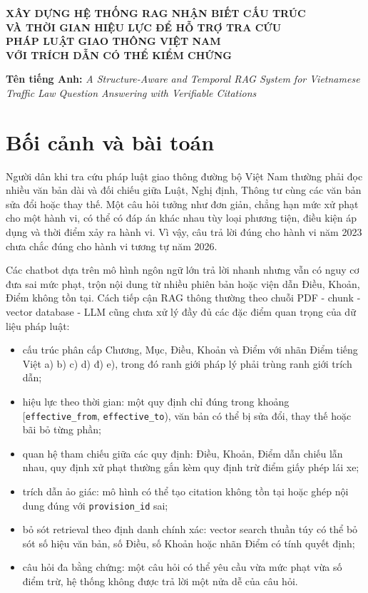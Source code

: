 \documentclass[12pt,a4paper]{article}
\begin{document}
\begin{center}
  {\bfseries\Large
  XÂY DỰNG HỆ THỐNG RAG NHẬN BIẾT CẤU TRÚC\\
  VÀ THỜI GIAN HIỆU LỰC ĐỂ HỖ TRỢ TRA CỨU\\
  PHÁP LUẬT GIAO THÔNG VIỆT NAM\\
  VỚI TRÍCH DẪN CÓ THỂ KIỂM CHỨNG}
\end{center}

\vspace{0.6em}

\noindent
\textbf{Tên tiếng Anh:}
\emph{A Structure-Aware and Temporal RAG System for Vietnamese Traffic Law Question Answering with Verifiable Citations}

\section{Bối cảnh và bài toán}

Người dân khi tra cứu pháp luật giao thông đường bộ Việt Nam thường phải đọc nhiều văn bản dài và đối chiếu giữa Luật, Nghị định, Thông tư cùng các văn bản sửa đổi hoặc thay thế. Một câu hỏi tưởng như đơn giản, chẳng hạn mức xử phạt cho một hành vi, có thể có đáp án khác nhau tùy loại phương tiện, điều kiện áp dụng và thời điểm xảy ra hành vi. Vì vậy, câu trả lời đúng cho hành vi năm 2023 chưa chắc đúng cho hành vi tương tự năm 2026.

Các chatbot dựa trên mô hình ngôn ngữ lớn trả lời nhanh nhưng vẫn có nguy cơ đưa sai mức phạt, trộn nội dung từ nhiều phiên bản hoặc viện dẫn Điều, Khoản, Điểm không tồn tại. Cách tiếp cận RAG thông thường theo chuỗi PDF - chunk - vector database - LLM cũng chưa xử lý đầy đủ các đặc điểm quan trọng của dữ liệu pháp luật:

\begin{itemize}
  \item cấu trúc phân cấp Chương, Mục, Điều, Khoản và Điểm với nhãn Điểm tiếng Việt a) b) c) d) đ) e), trong đó ranh giới pháp lý phải trùng ranh giới trích dẫn;
  \item hiệu lực theo thời gian: một quy định chỉ đúng trong khoảng [\texttt{effective\_from}, \texttt{effective\_to}), văn bản có thể bị sửa đổi, thay thế hoặc bãi bỏ từng phần;
  \item quan hệ tham chiếu giữa các quy định: Điều, Khoản, Điểm dẫn chiếu lẫn nhau, quy định xử phạt thường gắn kèm quy định trừ điểm giấy phép lái xe;
  \item trích dẫn ảo giác: mô hình có thể tạo citation không tồn tại hoặc ghép nội dung đúng với \texttt{provision\_id} sai;
  \item bỏ sót retrieval theo định danh chính xác: vector search thuần túy có thể bỏ sót số hiệu văn bản, số Điều, số Khoản hoặc nhãn Điểm có tính quyết định;
  \item câu hỏi đa bằng chứng: một câu hỏi có thể yêu cầu vừa mức phạt vừa số điểm trừ, hệ thống không được trả lời một nửa dễ của câu hỏi.
\end{itemize}
\end{document}
